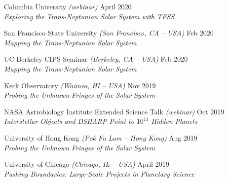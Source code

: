 \documentclass[margin]{res}
\begin{document}
\begin{resume}
Columbia University \textit{(webinar)} \hfill April 2020 \\
\textit{Exploring the Trans-Neptunian Solar System with TESS}

San Francisco State University \textit{(San Francisco, CA -- USA)} \hfill Feb 2020 \\
\textit{Mapping the Trans-Neptunian Solar System}

UC Berkeley CIPS Seminar \textit{(Berkeley, CA -- USA)} \hfill Feb 2020 \\
\textit{Mapping the Trans-Neptunian Solar System}

Keck Observatory \textit{(Waimea, HI -- USA)} \hfill Nov 2019 \\
\textit{Probing the Unknown Fringes of the Solar System}

NASA Astrobiology Institute Extended Science Talk \textit{(webinar)} \hfill Oct 2019 \\
\textit{Interstellar Objects and DSHARP Point to $10^{11}$ Hidden Planets}

University of Hong Kong \textit{(Pok Fu Lam -- Hong Kong)} \hfill Aug 2019 \\
\textit{Probing the Unknown Fringes of the Solar System}

University of Chicago \textit{(Chicago, IL -- USA)} \hfill April 2019 \\
\textit{Pushing Boundaries: Large-Scale Projects in Planetary Science}





\end{resume}
\end{document}
